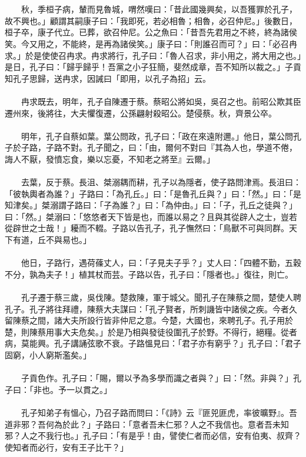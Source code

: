 \\\\
　　秋，季桓子病，輦而見魯城，喟然嘆曰：「昔此國幾興矣，以吾獲罪於孔子，故不興也。」顧謂其嗣康子曰：「我即死，若必相魯；相魯，必召仲尼。」後數日，桓子卒，康子代立。已葬，欲召仲尼。公之魚曰：「昔吾先君用之不終，終為諸侯笑。今又用之，不能終，是再為諸侯笑。」康子曰：「則誰召而可？」曰：「必召冉求。」於是使使召冉求。冉求將行，孔子曰：「魯人召求，非小用之，將大用之也。」是日，孔子曰：「歸乎歸乎！吾黨之小子狂簡，斐然成章，吾不知所以裁之。」子貢知孔子思歸，送冉求，因誡曰「即用，以孔子為招」云。
\\\\
　　冉求既去，明年，孔子自陳遷于蔡。蔡昭公將如吳，吳召之也。前昭公欺其臣遷州來，後將往，大夫懼復遷，公孫翩射殺昭公。楚侵蔡。秋，齊景公卒。
\\\\
　　明年，孔子自蔡如葉。葉公問政，孔子曰：「政在來遠附邇。」他日，葉公問孔子於子路，子路不對。孔子聞之，曰：「由，爾何不對曰『其為人也，學道不倦，誨人不厭，發憤忘食，樂以忘憂，不知老之將至』云爾。」
\\\\
　　去葉，反于蔡。長沮、桀溺耦而耕，孔子以為隱者，使子路問津焉。長沮曰：「彼執輿者為誰？」子路曰：「為孔丘。」曰：「是魯孔丘與？」曰：「然。」曰：「是知津矣。」桀溺謂子路曰：「子為誰？」曰：「為仲由。」曰：「子，孔丘之徒與？」曰：「然。」桀溺曰：「悠悠者天下皆是也，而誰以易之？且與其從辟人之士，豈若從辟世之士哉！」耰而不輟。子路以告孔子，孔子憮然曰：「鳥獸不可與同群。天下有道，丘不與易也。」
\\\\
　　他日，子路行，遇荷蓧丈人，曰：「子見夫子乎？」丈人曰：「四體不勤，五穀不分，孰為夫子！」植其杖而芸。子路以告，孔子曰：「隱者也。」復往，則亡。
\\\\
　　孔子遷于蔡三歲，吳伐陳。楚救陳，軍于城父。聞孔子在陳蔡之間，楚使人聘孔子。孔子將往拜禮，陳蔡大夫謀曰：「孔子賢者，所刺譏皆中諸侯之疾。今者久留陳蔡之間，諸大夫所設行皆非仲尼之意。今楚，大國也，來聘孔子。孔子用於楚，則陳蔡用事大夫危矣。」於是乃相與發徒役圍孔子於野。不得行，絕糧。從者病，莫能興。孔子講誦弦歌不衰。子路慍見曰：「君子亦有窮乎？」孔子曰：「君子固窮，小人窮斯濫矣。」
\\\\
　　子貢色作。孔子曰：「賜，爾以予為多學而識之者與？」曰：「然。非與？」孔子曰：「非也。予一以貫之。」
\\\\
　　孔子知弟子有慍心，乃召子路而問曰：「《詩》云『匪兕匪虎，率彼曠野』。吾道非邪？吾何為於此？」子路曰：「意者吾未仁邪？人之不我信也。意者吾未知邪？人之不我行也。」孔子曰：「有是乎！由，譬使仁者而必信，安有伯夷、叔齊？使知者而必行，安有王子比干？」
